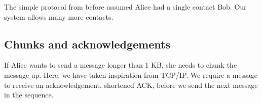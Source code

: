 The simple protocol from before assumed Alice had a single contact Bob. Our system allows many more contacts.


\subsection{Chunks and acknowledgements}

If Alice wants to send a message longer than 1 KB, she needs to chunk the message up. Here, we have taken inspiration from TCP/IP. We require a message to receive an acknowledgement, shortened ACK, before we send the next message in the sequence.


